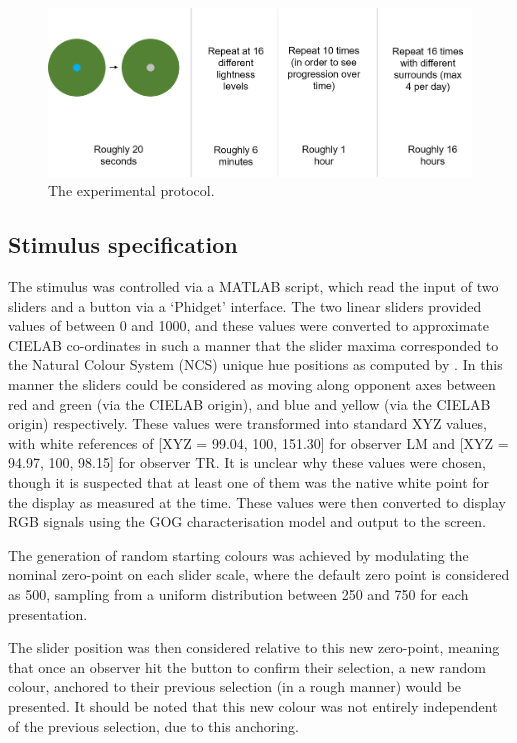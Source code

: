 \begin{figure}[htbp]
\includegraphics[max width=\textwidth]{figs/LargeSphere/ExperimentalPro.png}
\caption{The experimental protocol.}
\label{fig:ExperimentalPro}
\end{figure}

\subsection{Stimulus specification}
\label{sec:LSstim}

The stimulus was controlled via a MATLAB script, which read the input of two sliders and a button via a `Phidget' interface. The two linear sliders provided values of between 0 and 1000, and these values were converted to approximate CIELAB co-ordinates in such a manner that the slider maxima corresponded to the Natural Colour System (NCS) unique hue positions as computed by \citet{derefeldt_transformation_1986}. In this manner the sliders could be considered as moving along opponent axes between red and green (via the CIELAB origin), and blue and yellow (via the CIELAB origin) respectively. These values were transformed into standard XYZ values, with white references of [XYZ = 99.04, 100, 151.30] for observer LM and [XYZ = 94.97, 100, 98.15] for observer TR. It is unclear why these values were chosen, though it is suspected that at least one of them was the native white point for the display as measured at the time. These values were  then converted to display RGB signals using the GOG characterisation model and output to the screen.

The generation of random starting colours was achieved by modulating the nominal zero-point on each slider scale, where the default zero point is considered as 500, sampling from a uniform distribution between 250 and 750 for each presentation. 

The slider position was then considered relative to this new zero-point, meaning that once an observer hit the button to confirm their selection, a new random colour, anchored to their previous selection (in a rough manner) would be presented. It should be noted that this new colour was not entirely independent of the previous selection, due to this anchoring.

